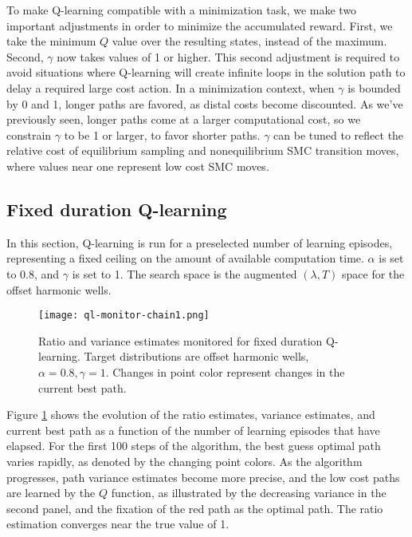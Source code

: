 To make Q-learning compatible with a minimization task, we make two important adjustments in order to minimize the accumulated reward.
First, we take the minimum $Q$ value over the resulting states, instead of the maximum.
Second, $\gamma$ now takes values of 1 or higher.
This second adjustment is required to avoid situations where Q-learning will create infinite loops in the solution path to delay a required large cost action. 
In a minimization context, when $\gamma$ is bounded by 0 and 1, longer paths are favored, as distal costs become discounted. 
As we've previously seen, longer paths come at a larger computational cost, so we constrain $\gamma$ to be 1 or larger, to favor shorter paths. 
$\gamma$ can be tuned to reflect the relative cost of equilibrium sampling and nonequilibrium SMC transition moves, where values near one represent low cost SMC moves.

\subsection{Fixed duration Q-learning} %
\label{sub:fixed_duration_q_learning}

In this section, Q-learning is run for a preselected number of learning episodes, representing a fixed ceiling on the amount of available computation time.
$\alpha$ is set to 0.8, and $\gamma$ is set to 1.
The search space is the augmented $(\lambda, T)$ space for the offset harmonic wells. 

\begin{figure}
    \centering
    \texttt{[image: ql-monitor-chain1.png]}
    \caption[Ratio and variance estimates monitored for fixed duration Q-learning]{Ratio and variance estimates monitored for fixed duration Q-learning. Target distributions are offset harmonic wells, $\alpha=0.8, \gamma=1$. Changes in point color represent changes in the current best path.}
    \label{fig:ql-summary}
\end{figure}

Figure \ref{fig:ql-summary} shows the evolution of the ratio estimates, variance estimates, and current best path as a function of the number of learning episodes that have elapsed.
For the first 100 steps of the algorithm, the best guess optimal path varies rapidly, as denoted by the changing point colors.
As the algorithm progresses, path variance estimates become more precise, and the low cost paths are learned by the $Q$ function, as illustrated by the decreasing variance in the second panel, and the fixation of the red path as the optimal path.
The ratio estimation converges near the true value of 1. 

